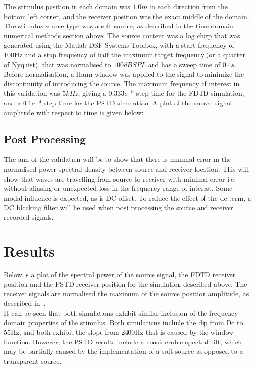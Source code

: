 The stimulus position in each domain was $1.0m$ in each direction from the bottom left corner, and the receiver position was the exact middle of the domain. The stimulus source type was a soft source, as described in the time domain numerical methods section above. The source content was a log chirp that was generated using the Matlab DSP Systems Toolbox, with a start frequency of 100Hz and a stop frequency of half the maximum target frequency (or a quarter of Nyquist), that was normalised to $100dBSPL$ and has a sweep time of $0.4s$. Before normalisation, a Hann window was applied to the signal to minimize the discontinuity of introducing the source. The maximum frequency of interest in this validation was $5kHz$, giving a $0.333e^{-5}$ step time for the FDTD simulation, and a $0.1e^{-4}$ step time for the PSTD simulation. A plot of the source signal amplitude with respect to time is given below:\\

\subsection{Post Processing}
The aim of the validation will be to show that there is minimal error in the normalised power spectral density between source and receiver location. This will show that waves are travelling from source to receiver with minimal error i.e. without aliasing or unexpected loss in the frequency range of interest. Some modal influence is expected, as is DC offset. To reduce the effect of the dc term, a DC blocking filter will be used when post processing the source and receiver recorded signals.

\section{Results}
Below is a plot of the spectral power of the source signal, the FDTD receiver position and the PSTD receiver position for the simulation described above. The receiver signals are normalised the maximum of the source position amplitude, as described in~\cite{Murphy2014}.\\ 

It can be seen that both simulations exhibit similar inclusion of the frequency domain properties of the stimulus. Both simulations include the dip from Dc to 55Hz, and both exhibit the slope from 2400Hz that is caused by the window function. However, the PSTD results include a considerable spectral tilt, which may be partially caused by the implementation of a soft source as opposed to a transparent source.\\


